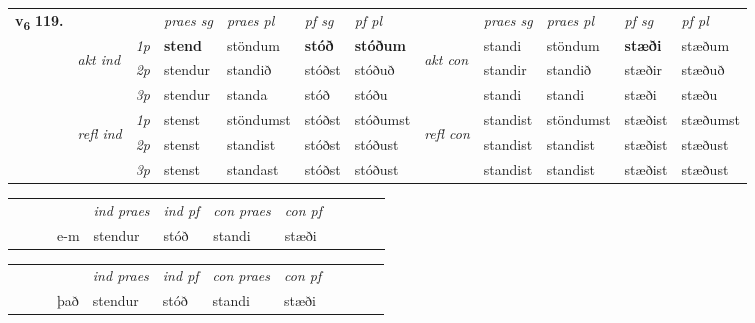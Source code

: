 \begin{tabular}{llllllllllll} \toprule
\multirow{4}{*}{{{\textbf{v{\textsubscript{6}}} \Large{\textbf{119.}}}}}  & &   &  \textit{praes sg}  & \textit{praes pl}  &\textit{ pf sg} & \textit{pf pl} &  &  \textit{praes sg}  & \textit{praes pl}  & \textit{pf sg} & \textit{pf pl } \\*
	\cmidrule{4-7} \cmidrule{9-12}
 & \multirow{3}{*}{\begin{turn}{90}\textit{akt ind}\end{turn}} & {\textit{1p}} & \textbf{stend} & stöndum    & \textbf{stóð} & \textbf{stóðum} & \multirow{3}{*}{\begin{turn}{90}\textit{akt con}\end{turn}} &standi & stöndum & \textbf{stæði} & stæðum\\*
& &  {\textit{2p}} &  stendur  & standið   & stóðst & stóðuð & & standir & standið & stæðir & stæðuð \\*
& &  {\textit{3p}} & stendur & standa   & stóð & stóðu & & standi & standi& stæði & stæðu  \\*
\cmidrule{4-7} \cmidrule{9-12}
 &\multirow{3}{*}{\begin{turn}{90}\textit{refl ind}\end{turn}} & {\textit{1p}} & stenst & stöndumst    & stóðst & stóðumst & \multirow{3}{*}{\begin{turn}{90}\textit{refl con}\end{turn}}  &standist & stöndumst & stæðist & stæðumst\\*
 &&  {\textit{2p}} &  stenst  & standist   & stóðst & stóðust & &standist & standist & stæðist & stæðust \\*
& &  {\textit{3p}} & stenst & standast   & stóðst & stóðust & & standist & standist& stæðist & stæðust  \\*
\cmidrule{4-7} \cmidrule{9-12}
\end{tabular}


\begin{tabular}{llllllllllll}
 & &  & &  \textit{ind praes} & \textit{ind pf} & \textit{con praes} & \textit{con pf} \\*
&  & & e-m & stendur & stóð & standi & stæði \\*
\cmidrule{5-9}
\end{tabular}


\begin{tabular}{llllllllllll}
 & &  & &  \textit{ind praes} & \textit{ind pf} & \textit{con praes} & \textit{con pf} \\*
&  & & það & stendur & stóð & standi & stæði \\*
\cmidrule{5-9}
\end{tabular}


